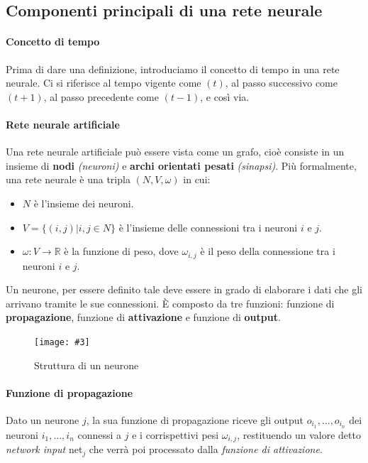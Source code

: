 \documentclass[12pt, twoside, letterpaper]{report}
\newcommand{\img}[4] {
	\begin{figure}[h]
		\caption{#1}
		\centering
		\texttt{[image: \#3]}\\
		\label{#4}
	\end{figure}
}
\begin{document}
			
		\subsection{Componenti principali di una rete neurale} 
			\paragraph{Concetto di tempo} Prima di dare una definizione, introduciamo il concetto di tempo in una rete neurale. Ci si riferisce al tempo vigente come $(t)$, al passo successivo come $(t+1)$, al passo precedente come $(t-1)$, e così via.
			\paragraph{Rete neurale artificiale}
			Una rete neurale artificiale può essere vista come un grafo, cioè consiste in un insieme di \textbf{nodi} \textit{(neuroni)} e \textbf{archi orientati pesati} \textit{(sinapsi)}. Più formalmente, una rete neurale è una tripla $(N,V, \omega)$ in cui:
			\begin{itemize}
				\item $N$ è l'insieme dei neuroni.
				\item $V = \{(i,j) | i,j \in N\}$ è l'insieme delle connessioni tra i neuroni $i$ e $j$.
				\item $\omega: V \rightarrow \mathbb{R}$ è la funzione di peso, dove $\omega_{i,j}$ è il peso della connessione tra i neuroni $i$ e $j$.
			\end{itemize}
			Un neurone, per essere definito tale deve essere in grado di elaborare i dati che gli arrivano tramite le sue connessioni. È composto da tre funzioni: funzione di \textbf{propagazione}, funzione di \textbf{attivazione} e funzione di \textbf{output}. 
			
			\img{Struttura di un neurone}{0.4}{neurone.png}{neurone}
			
			 \paragraph{Funzione di propagazione} Dato un neurone $j$, la sua funzione di propagazione riceve gli output $o_{i_1}, \dots, o_{i_n}$ dei neuroni $i_1, \dots, i_n$ connessi a $j$ e i corrispettivi pesi $\omega_{i,j}$, restituendo un valore detto \textit{network input} net$_j$ che verrà poi processato dalla \textit{funzione di attivazione}. 
			 
\end{document}
